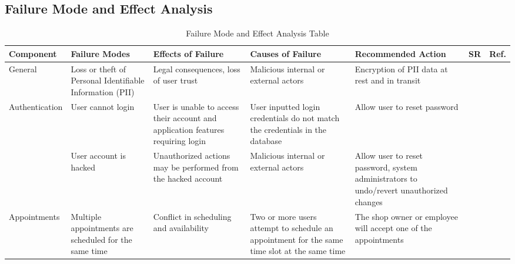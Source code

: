 \documentclass{article}
\begin{document}
\newpage
\begin{landscape}
	\section{Failure Mode and Effect Analysis}
	\begin{table}[H]
		\centering
		\caption{Failure Mode and Effect Analysis Table}
		\begin{adjustbox}{width=\paperwidth}
			\begin{tabular}{|l|l|l|l|l|l|l|}
				\hline
				\textbf{Component}              & \textbf{Failure Modes}                                   & \textbf{Effects of Failure}                                                     & \textbf{Causes of Failure}                                                                   & \textbf{Recommended Action}                                                             & \textbf{SR} & \textbf{Ref.} \\
				\hline
				General                         & Loss or theft of Personal Identifiable Information (PII) & Legal consequences, loss of user trust                                          & Malicious internal or external actors                                                        & Encryption of PII data at rest and in transit                                           & ~           & ~             \\
				\hline
				\multirow{2}{*}{Authentication} & User cannot login                                        & User is unable to access their account and application features requiring login & User inputted login credentials do not match the credentials in the database                 & Allow user to reset password                                                            & ~           & ~             \\
				\cline{2-7}
				                                & User account is hacked                                   & Unauthorized actions may be performed from the hacked account                   & Malicious internal or external actors                                                        & Allow user to reset password, system administrators to undo/revert unauthorized changes & ~           & ~             \\
				\hline
				Appointments                    & Multiple appointments are scheduled for the same time    & Conflict in scheduling and availability                                         & Two or more users attempt to schedule an appointment for the same time slot at the same time & The shop owner or employee will accept one of the appointments                          & ~           & ~             \\

\end{tabular}
\end{adjustbox}
\end{table}
\end{landscape}
\end{document}
